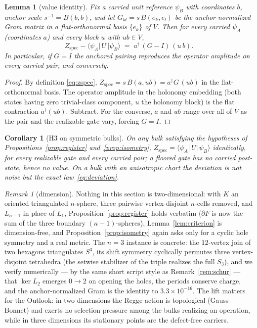 \documentclass[a4paper,twocolumn,11pt,unpublished]{quantumarticle}
\theoremstyle{plain}
\newtheorem{lemma}[proposition]{Lemma}
\newtheorem{corollary}[proposition]{Corollary}
\theoremstyle{remark}
\newtheorem{remark}[proposition]{Remark}
\newcommand{\amp}[3]{\langle#1|\,#2\,|#3\rangle}
\newcommand{\Zspec}{Z_{\mathrm{spec}}}
\begin{document}
\begin{lemma}[value identity]
\label{lem:value}
Fix a carried unit reference $\psi_B$ with coordinates $b$, anchor scale
$s^{-1}=B(b,b)$, and let $G_{kl}=s\,B(e_k,e_l)$ be the anchor-normalized
Gram matrix in a flat-orthonormal basis $\{e_k\}$ of $V$. Then for every
carried $\psi_A$ (coordinates $a$) and every block $u$ with $ub\in V$,
\begin{equation}
  \Zspec-\amp{\psi_A}{U}{\psi_B}\;=\;a^\dagger\,(G-I)\,(u\,b).
  \label{eq:deviation}
\end{equation}
In particular, if $G=I$ the anchored pairing reproduces the operator
amplitude on every carried pair, and conversely.
\end{lemma}

\begin{proof}
By definition \eqref{eq:zspec}, $\Zspec=s\,B(a,ub)=a^\dagger G\,(ub)$ in
the flat-orthonormal basis. The operator amplitude in the holonomy
embedding (both states having zero trivial-class component, $u$ the
holonomy block) is the flat contraction $a^\dagger(ub)$. Subtract. For
the converse, $a$ and $ub$ range over all of $V$ as the pair and the
realizable gate vary, forcing $G=I$.
\end{proof}

\begin{corollary}[H3 on symmetric bulks]
\label{cor:h3}
On any bulk satisfying the hypotheses of
Propositions~\ref{prop:register} and~\ref{prop:isometry},
$\Zspec=\amp{\psi_A}{U}{\psi_B}$ identically, for every realizable gate
and every carried pair; a floored gate has no carried post-state, hence
no value. On a bulk with an anisotropic chart the deviation is not noise
but the exact law~\eqref{eq:deviation}.
\end{corollary}

\begin{remark}[dimension]
\label{rem:dimension}
Nothing in this section is two-dimensional: with $K$ an oriented
triangulated $n$-sphere, three pairwise vertex-disjoint $n$-cells
removed, and $L_{n-1}$ in place of $L_1$,
Proposition~\ref{prop:register} holds verbatim ($\partial F$ is now the
sum of the three boundary $(n{-}1)$-spheres), Lemma~\ref{lem:criterion}
is dimension-free, and Proposition~\ref{prop:isometry} again asks only
for a cyclic hole symmetry and a real metric. The $n=3$ instance is
concrete: the $12$-vertex join of two hexagons triangulates $S^3$, its
shift symmetry cyclically permutes three vertex-disjoint tetrahedra
(the setwise stabilizer of the triple realizes the full $S_3$), and we
verify numerically --- by the same short script style as
Remark~\ref{rem:schur} --- that $\ker L_2$ emerges $0\to2$ on opening
the holes, the periods conserve charge, and the anchor-normalized Gram
is the identity to $3.3\times10^{-16}$. The lift matters for the
Outlook: in two dimensions the Regge action is topological
(Gauss--Bonnet) and exerts no selection pressure among the bulks
realizing an operation, while in three dimensions its stationary points
are the defect-free carriers.
\end{remark}
\end{document}
